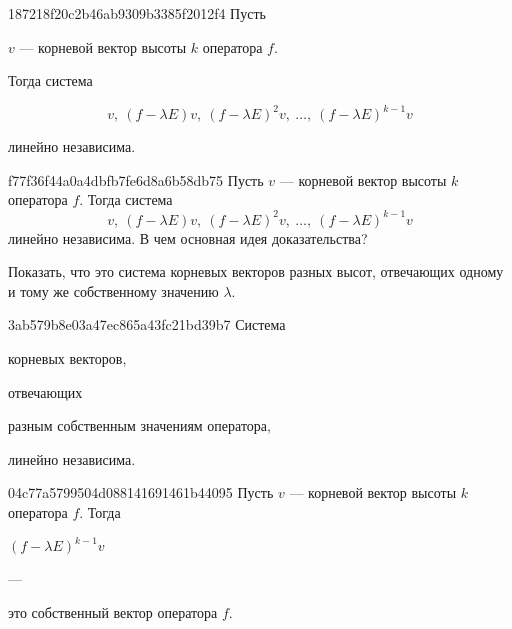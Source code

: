 \begin{note}{187218f20c2b46ab9309b3385f2012f4}
    Пусть \begin{icloze}{3}\( v \) --- корневой вектор высоты \( k \) оператора \( f \).\end{icloze}
    Тогда система
    \begin{icloze}{2}
        \[
            v,\: (f - \lambda E) v,\: (f - \lambda E)^{2} v,\: \ldots,\: (f - \lambda E)^{k - 1} v
        \]
    \end{icloze}
    \begin{icloze}{1}линейно независима.\end{icloze}
\end{note}

\begin{note}{f77f36f44a0a4dbfb7fe6d8a6b58db75}
    Пусть \( v \) --- корневой вектор высоты \( k \) оператора \( f \).
    Тогда система
    \[
        v,\: (f - \lambda E) v,\: (f - \lambda E)^{2} v,\: \ldots,\: (f - \lambda E)^{k - 1} v
    \]
    линейно независима.
    В чем основная идея доказательства?

    \begin{cloze}{1}
        Показать, что это система корневых векторов разных высот, отвечающих одному и тому же собственному значению \( \lambda \).
    \end{cloze}
\end{note}

\begin{note}{3ab579b8e03a47ec865a43fc21bd39b7}
    Система \begin{icloze}{3}корневых векторов,\end{icloze} отвечающих \begin{icloze}{2}разным собственным значениям оператора,\end{icloze} \begin{icloze}{1}линейно независима.\end{icloze}
\end{note}

\begin{note}{04c77a5799504d088141691461b44095}
    Пусть \( v \) --- корневой вектор высоты \( k \) оператора \( f \). Тогда \begin{icloze}{2}\( (f - \lambda E)^{k - 1}v \)\end{icloze} --- \begin{icloze}{1}это собственный вектор оператора \( f \).\end{icloze}
\end{note}

